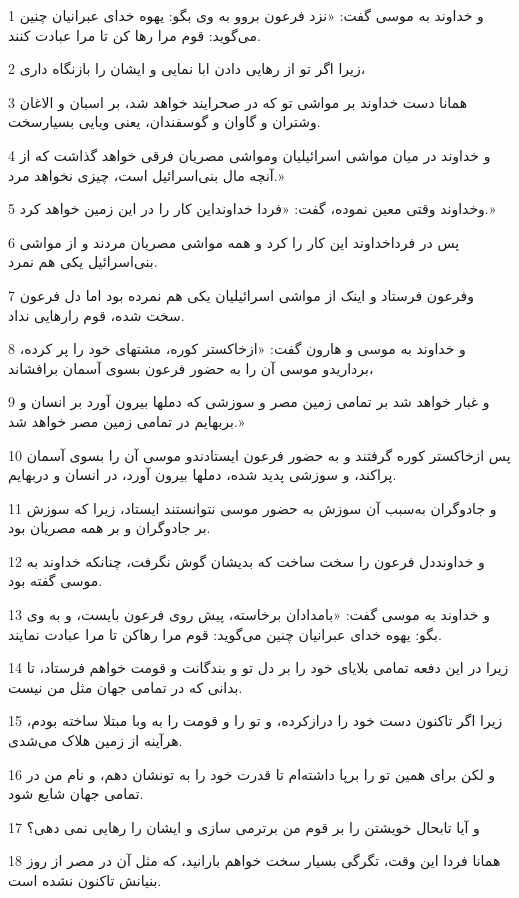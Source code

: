 \par 1 و خداوند به موسی گفت: «نزد فرعون بروو به وی بگو: یهوه خدای عبرانیان چنین می‌گوید: قوم مرا رها کن تا مرا عبادت کنند.
\par 2 زیرا اگر تو از رهایی دادن ابا نمایی و ایشان را بازنگاه داری،
\par 3 همانا دست خداوند بر مواشی تو که در صحرایند خواهد شد، بر اسبان و الاغان وشتران و گاوان و گوسفندان، یعنی وبایی بسیارسخت.
\par 4 و خداوند در میان مواشی اسرائیلیان ومواشی مصریان فرقی خواهد گذاشت که از آنچه مال بنی‌اسرائیل است، چیزی نخواهد مرد.»
\par 5 وخداوند وقتی معین نموده، گفت: «فردا خداونداین کار را در این زمین خواهد کرد.»
\par 6 پس در فرداخداوند این کار را کرد و همه مواشی مصریان مردند و از مواشی بنی‌اسرائیل یکی هم نمرد.
\par 7 وفرعون فرستاد و اینک از مواشی اسرائیلیان یکی هم نمرده بود اما دل فرعون سخت شده، قوم رارهایی نداد.
\par 8 و خداوند به موسی و هارون گفت: «ازخاکستر کوره، مشتهای خود را پر کرده، برداریدو موسی آن را به حضور فرعون بسوی آسمان برافشاند،
\par 9 و غبار خواهد شد بر تمامی زمین مصر و سوزشی که دملها بیرون آورد بر انسان و بربهایم در تمامی زمین مصر خواهد شد.»
\par 10 پس ازخاکستر کوره گرفتند و به حضور فرعون ایستادندو موسی آن را بسوی آسمان پراکند، و سوزشی پدید شده، دملها بیرون آورد، در انسان و دربهایم.
\par 11 و جادوگران به‌سبب آن سوزش به حضور موسی نتوانستند ایستاد، زیرا که سوزش بر جادوگران و بر همه مصریان بود.
\par 12 و خداونددل فرعون را سخت ساخت که بدیشان گوش نگرفت، چنانکه خداوند به موسی گفته بود.
\par 13 و خداوند به موسی گفت: «بامدادان برخاسته، پیش روی فرعون بایست، و به وی بگو: یهوه خدای عبرانیان چنین می‌گوید: قوم مرا رهاکن تا مرا عبادت نمایند.
\par 14 زیرا در این دفعه تمامی بلایای خود را بر دل تو و بندگانت و قومت خواهم فرستاد، تا بدانی که در تمامی جهان مثل من نیست.
\par 15 زیرا اگر تاکنون دست خود را درازکرده، و تو را و قومت را به وبا مبتلا ساخته بودم، هرآینه از زمین هلاک می‌شدی.
\par 16 و لکن برای همین تو را برپا داشته‌ام تا قدرت خود را به تونشان دهم، و نام من در تمامی جهان شایع شود.
\par 17 و آیا تابحال خویشتن را بر قوم من برترمی سازی و ایشان را رهایی نمی دهی؟
\par 18 همانا فردا این وقت، تگرگی بسیار سخت خواهم بارانید، که مثل آن در مصر از روز بنیانش تاکنون نشده است.
